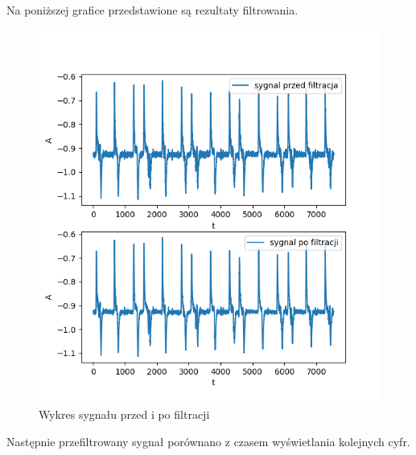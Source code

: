 \documentclass[licencjacka]{kdypl}
\begin{document}
Na poniższej grafice przedstawione są rezultaty filtrowania.

\begin{figure}[H]
		\centering
		\includegraphics[scale=0.8]{sygnaly.PNG}
		\caption{Wykres sygnału przed i po filtracji}
		\end{figure}

\newpage		
Następnie przefiltrowany sygnał porównano z czasem wyświetlania kolejnych cyfr.
		
\end{document}
